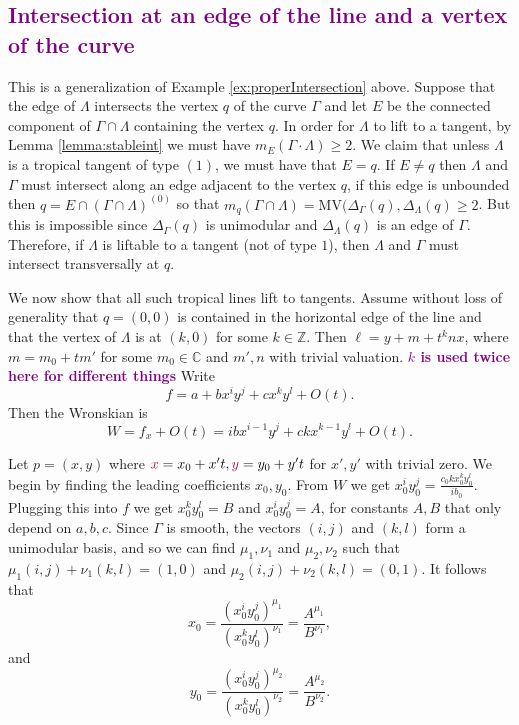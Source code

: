 \documentclass[oneside]{amsart}
\theoremstyle{definition}
\newcommand{\kristin}[1]{\textcolor{purple}{#1}}
\begin{document}
\subsection{\kristin{Intersection at an edge of the line and a vertex of the curve}}\label{sec:edgelinevertcurve}
This is a generalization of Example \ref{ex:properIntersection} above.
Suppose that the edge of $\Lambda$ intersects the vertex $q$ of the curve $\Gamma$ and let $E$ be the connected component of $\Gamma \cap \Lambda$ containing the vertex $q$. 
In order for $\Lambda$ to lift to a tangent, by Lemma \ref{lemma:stableint} we must have $m_E(\Gamma \cdot \Lambda) \geq 2$. We claim that unless $\Lambda$ is a tropical tangent of type $(1)$, we must have that $E = q$. If $E \neq q$ then  $\Lambda $ and $\Gamma$ must intersect along an edge adjacent to the vertex $q$, if this edge is unbounded then $q = 
E \cap (\Gamma \cap \Lambda)^{(0)}$ so that $m_q(\Gamma \cap \Lambda) = \text{MV}(\Delta_{\Gamma}(q), \Delta_{\Lambda}(q)  \geq 2$. But this is impossible since $\Delta_{\Gamma}(q)$ is unimodular and $\Delta_{\Lambda}(q)$ is an edge of $\Gamma$. 
Therefore, if $\Lambda$ is liftable to a tangent (not of type $1$), then $\Lambda$ and $\Gamma$ must intersect transversally at $q$. 

We now show that all such tropical lines lift to tangents. Assume without loss of generality that $q = (0, 0)$ is contained in the  horizontal edge of the line and that the vertex of $\Lambda$ is at $(k,0)$ for some $k\in\mathbb{Z}$. Then $\ell = y+m+t^knx$, where $m = m_0 + tm'$ for some $m_0\in\mathbb{C}$ and $m',n$ with trivial valuation. %
\kristin{\textbf{$k$ is used twice here for different things}}
Write
\[
f = a+ bx^iy^j + cx^ky^l + O(t).
\]
Then the Wronskian is 
\[
W = f_x  + O(t) = ibx^{i-1}y^j + ckx^{k-1}y^l + O(t).
\]

Let 
$p=(x,y)$
 where $\kristin{x} = x_0 + x't,  \kristin{y} = y_0+y't$ for $x',y'$ with trivial zero.
We begin by finding the leading coefficients $x_0,y_0$. From $W$ we get $x_0^iy_0^j = \frac{c_0kx_0^ky_0^{l}}{ib_0}$. Plugging this into $f$ we get $x_0^ky_0^{l} = B$ and $x_0^iy_0^j = A$, for constants $A,B$ that only depend on $a,b,c$. Since $\Gamma$ is smooth, the vectors $(i,j)$ and $(k,l)$ form a unimodular basis, and so we can find $\mu_1,\nu_1$ and $\mu_2,\nu_2$ such that $\mu_1 (i,j) + \nu_1 (k,l) = (1,0)$ and $\mu_2 (i,j) + \nu_2 (k,l) = (0,1)$. It follows that 
\[
x_0 = \frac{(x_0^i y_0^j)^{\mu_1}}{(x_0^k y_0^{l})^{\nu_1}} = \frac{A^{\mu_1}}{B^{\nu_1}},
\]
and 
\[
y_0 = \frac{(x_0^i y_0^j)^{\mu_2}}{(x_0^k y_0^{l})^{\nu_2}} = \frac{A^{\mu_2}}{B^{\nu_2}}.
\]
\end{document}
